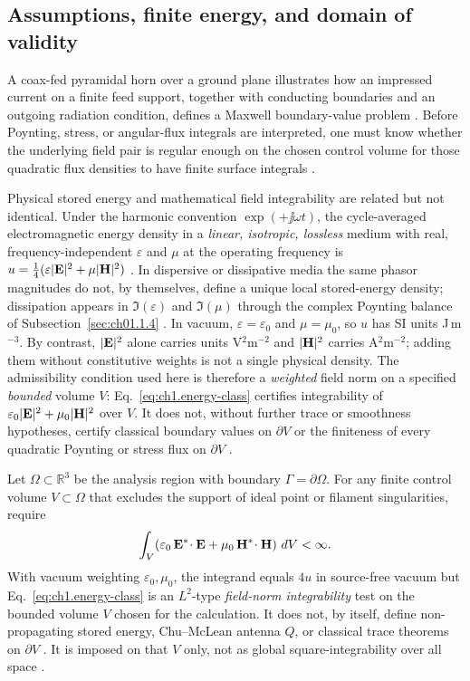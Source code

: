 \subsection{Assumptions, finite energy, and domain of validity}
\label{sec:ch01.0.3}

A coax-fed pyramidal horn over a ground plane illustrates how an impressed current on a finite feed support, together with conducting boundaries and an outgoing radiation condition, defines a Maxwell boundary-value problem \cite{stratton1941}. Before Poynting, stress, or angular-flux integrals are interpreted, one must know whether the underlying field pair is regular enough on the chosen control volume for those quadratic flux densities to have finite surface integrals \cite{maxwell1873,poynting1884,stratton1941}.

Physical stored energy and mathematical field integrability are related but not identical. Under the harmonic convention \(\exp(+\jj\omega t)\), the cycle-averaged electromagnetic energy density in a \emph{linear, isotropic, lossless} medium with real, frequency-independent \(\varepsilon\) and \(\mu\) at the operating frequency is \(u=\tfrac14(\varepsilon|\mathbf{E}|^{2}+\mu|\mathbf{H}|^{2})\) \cite{stratton1941}. In dispersive or dissipative media the same phasor magnitudes do not, by themselves, define a unique local stored-energy density; dissipation appears in \(\Im(\varepsilon)\) and \(\Im(\mu)\) through the complex Poynting balance of Subsection~\ref{sec:ch01.1.4} \cite{stratton1941,harrington2001}. In vacuum, \(\varepsilon=\varepsilon_0\) and \(\mu=\mu_0\), so \(u\) has SI units J\,m\(^{-3}\). By contrast, \(|\mathbf{E}|^{2}\) alone carries units V\(^2\)m\(^{-2}\) and \(|\mathbf{H}|^{2}\) carries A\(^2\)m\(^{-2}\); adding them without constitutive weights is not a single physical density. The admissibility condition used here is therefore a \emph{weighted} field norm on a specified \emph{bounded} volume \(V\): Eq.~\eqref{eq:ch1.energy-class} certifies integrability of \(\varepsilon_0|\mathbf{E}|^{2}+\mu_0|\mathbf{H}|^{2}\) over \(V\). It does not, without further trace or smoothness hypotheses, certify classical boundary values on \(\partial V\) or the finiteness of every quadratic Poynting or stress flux on \(\partial V\) \cite{stratton1941}.

Let \(\Omega\subset\mathbb{R}^{3}\) be the analysis region with boundary \(\Gamma=\partial\Omega\). For any finite control volume \(V\subset\Omega\) that excludes the support of ideal point or filament singularities, require
\begin{equation}
\label{eq:ch1.energy-class}
\int_{V}\!\left(\varepsilon_0\,\mathbf{E}^*\!\cdot\mathbf{E}+\mu_0\,\mathbf{H}^*\!\cdot\mathbf{H}\right)\,dV<\infty.
\end{equation}
With vacuum weighting \(\varepsilon_0,\mu_0\), the integrand equals \(4u\) in source-free vacuum but Eq.~\eqref{eq:ch1.energy-class} is an \(L^2\)-type \emph{field-norm integrability} test on the bounded volume \(V\) chosen for the calculation. It does not, by itself, define non-propagating stored energy, Chu--McLean antenna \(Q\), or classical trace theorems on \(\partial V\) \cite{stratton1941,harrington2001}. It is imposed on that \(V\) only, not as global square-integrability over all space \cite{stratton1941}.

